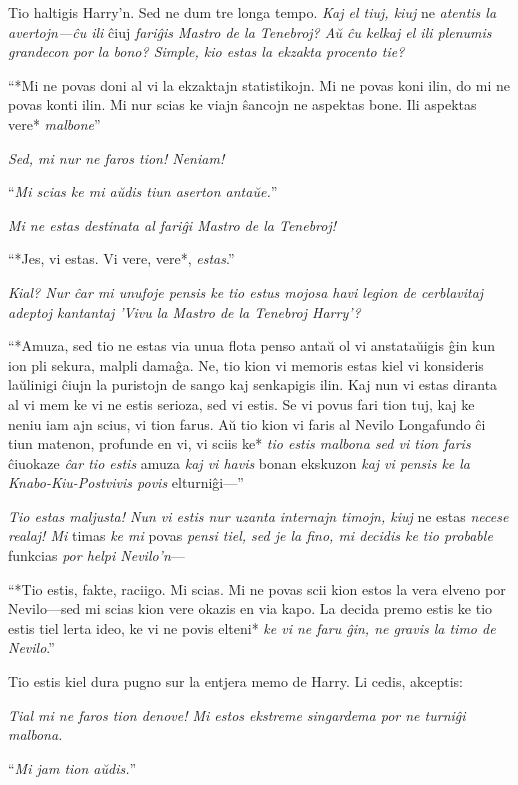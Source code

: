 Tio haltigis Harry'n. Sed ne dum tre longa tempo. \emph{Kaj el tiuj,
  kiuj} ne \emph{atentis la avertojn—ĉu ili} ĉiuj \emph{fariĝis Mastro
  de la Tenebroj? Aŭ ĉu kelkaj el ili plenumis grandecon por la bono?
  Simple, kio estas la ekzakta procento tie?}

``*Mi ne povas doni al vi la ekzaktajn statistikojn. Mi ne povas koni
ilin, do mi ne povas konti ilin. Mi nur scias ke viajn ŝancojn ne
aspektas bone. Ili aspektas vere* \emph{malbone}''

\emph{Sed, mi nur ne faros tion! Neniam!}

``\emph{Mi scias ke mi aŭdis tiun aserton antaŭe.}''

\emph{Mi ne estas destinata al fariĝi Mastro de la Tenebroj!}

``*Jes, vi estas. Vi vere, vere*, \emph{estas}.''

\emph{Kial? Nur ĉar mi unufoje pensis ke tio estus mojosa havi legion
  de cerblavitaj adeptoj kantantaj 'Vivu la Mastro de la Tenebroj
  Harry'?}

``*Amuza, sed tio ne estas via unua flota penso antaŭ ol vi
anstataŭigis ĝin kun ion pli sekura, malpli damaĝa. Ne, tio kion vi
memoris estas kiel vi konsideris laŭlinigi ĉiujn la puristojn de sango
kaj senkapigis ilin. Kaj nun vi estas diranta al vi mem ke vi ne estis
serioza, sed vi estis. Se vi povus fari tion tuj, kaj ke neniu iam ajn
scius, vi tion farus. Aŭ tio kion vi faris al Nevilo Longafundo ĉi
tiun matenon, profunde en vi, vi sciis ke* \emph{tio estis malbona sed
  vi tion faris} ĉiuokaze \emph{ĉar tio estis} amuza \emph{kaj vi
  havis} bonan ekskuzon \emph{kaj vi pensis ke la Knabo-Kiu-Postvivis
  povis} elturniĝi—''

\emph{Tio estas maljusta! Nun vi estis nur uzanta internajn timojn,
kiuj} ne estas \emph{necese realaj! Mi} timas \emph{ke mi} povas
\emph{pensi tiel, sed je la fino, mi decidis ke tio probable} funkcias
\emph{por helpi Nevilo'n}—

``*Tio estis, fakte, raciigo. Mi scias. Mi ne povas scii kion estos la
vera elveno por Nevilo—sed mi scias kion vere okazis en via kapo. La
decida premo estis ke tio estis tiel lerta ideo, ke vi ne povis elteni*
\emph{ke vi ne faru ĝin, ne gravis la timo de Nevilo}.''

Tio estis kiel dura pugno sur la entjera memo de Harry. Li cedis, akceptis:

\emph{Tial mi ne faros tion denove! Mi estos ekstreme singardema por
  ne turniĝi malbona.}

``\emph{Mi jam tion aŭdis.}''

